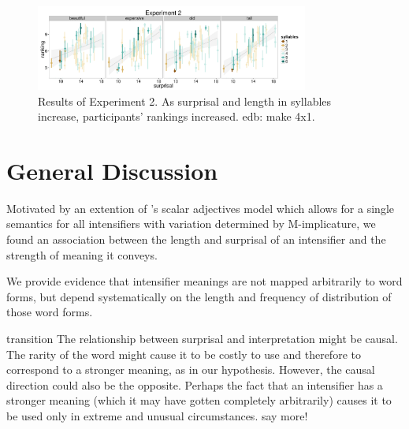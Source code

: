 \documentclass[10pt,letterpaper]{article}
\newcommand{\w}[1]{\emph{#1}}
\newcommand{\todo}[1]{{\color{red}#1}}
\begin{document}
\begin{figure}[ht]
\begin{center}
\includegraphics[width=0.8\textwidth]{analysis_files_for_writeup/images/exp2-plot.png}
\end{center}
\caption{Results of Experiment 2. As surprisal and length in syllables increase, participants' rankings increased. \todo{edb: make 4x1.}} 
\label{exp2-plot}
\end{figure}

\section{General Discussion}

Motivated by an extention of 's scalar adjectives model which allows for a single semantics for all intensifiers with variation determined by M-implicature, we found an association between the length and surprisal of an intensifier and the strength of meaning it conveys.

We provide evidence that intensifier meanings are not mapped arbitrarily to word forms, but depend systematically on the length and frequency of distribution of those word forms.

%

\todo{transition}
The relationship between surprisal and interpretation \todo{might} be causal. The rarity of the word \todo{might} cause it to be costly to use and therefore to correspond to a stronger meaning, as in our hypothesis.
However, the causal direction could also be the opposite.
Perhaps the fact that an intensifier has a stronger meaning (which it may have gotten completely arbitrarily) causes it to be used only in extreme and unusual circumstances.
\todo{say more!}
\end{document}
